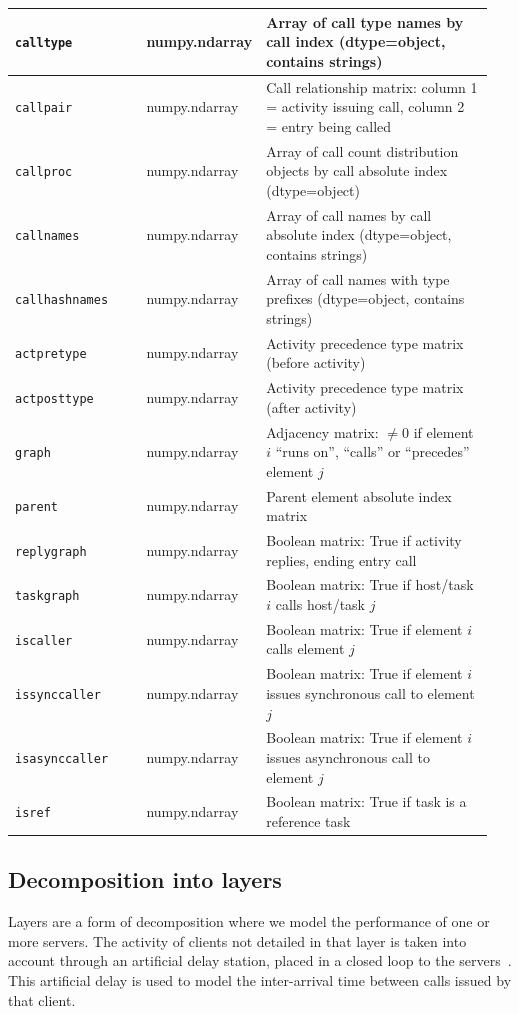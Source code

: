 \begin{PYTHON}
{\begin{longtable}{|p{0.28\linewidth}|p{0.17\linewidth}|p{0.50\linewidth}|}
\texttt{calltype} & numpy.ndarray & Array of call type names by call index (dtype=object, contains strings)\\\hline
\texttt{callpair} & numpy.ndarray & Call relationship matrix: column 1 = activity issuing call, column 2 = entry being called\\\hline
\texttt{callproc} & numpy.ndarray & Array of call count distribution objects by call absolute index (dtype=object)\\\hline
\texttt{callnames} & numpy.ndarray & Array of call names by call absolute index (dtype=object, contains strings)\\\hline
\texttt{callhashnames} & numpy.ndarray & Array of call names with type prefixes (dtype=object, contains strings)\\\hline
\texttt{actpretype} & numpy.ndarray & Activity precedence type matrix (before activity)\\\hline
\texttt{actposttype} & numpy.ndarray & Activity precedence type matrix (after activity)\\\hline
\texttt{graph} & numpy.ndarray & Adjacency matrix: $\neq 0$ if element $i$ ``runs on'', ``calls'' or ``precedes'' element $j$\\\hline
\texttt{parent} & numpy.ndarray & Parent element absolute index matrix\\\hline
\texttt{replygraph} & numpy.ndarray & Boolean matrix: True if activity replies, ending entry call\\\hline
\texttt{taskgraph} & numpy.ndarray & Boolean matrix: True if host/task $i$ calls host/task $j$\\\hline
\texttt{iscaller} & numpy.ndarray & Boolean matrix: True if element $i$ calls element $j$\\\hline
\texttt{issynccaller} & numpy.ndarray & Boolean matrix: True if element $i$ issues synchronous call to element $j$\\\hline
\texttt{isasynccaller} & numpy.ndarray & Boolean matrix: True if element $i$ issues asynchronous call to element $j$\\\hline
\texttt{isref} & numpy.ndarray & Boolean matrix: True if task is a reference task\\\hline
\end{longtable}
}
\end{PYTHON}

\subsection{Decomposition into layers}
Layers are a form of decomposition where we model the performance of one or more servers. The activity of clients not detailed in that layer is taken into account through an artificial delay station, placed in a closed loop to the servers~\cite{roli.sevc95}. This artificial delay is used to model the inter-arrival time between calls issued by that client.

